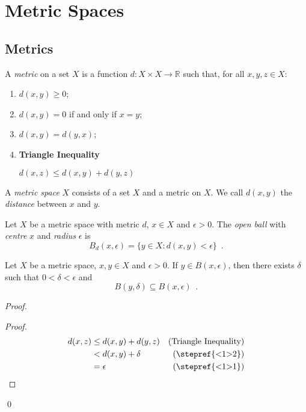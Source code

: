 \chapter{Metric Spaces}

\section{Metrics}

\begin{df}[Metric]
  A \emph{metric} on a set $X$ is a function $d : X \times X \rightarrow
  \mathbb{R}$ such that, for all $x, y, z \in X$:
  \begin{enumerate}
    \item $d(x, y) \geq 0$;
    \item $d(x, y) = 0$ if and only if $x = y$;
    \item $d(x, y) = d(y, x)$;
    \item \textbf{Triangle Inequality}

    $d(x, z) \leq d(x, y) + d(y, z)$
  \end{enumerate}
  A \emph{metric space} $X$ consists of a set $X$ and a metric on $X$. We
  call $d(x, y)$ the \emph{distance} between $x$ and $y$.
\end{df}

\begin{df}
  Let $X$ be a metric space with metric $d$, $x \in X$ and $\epsilon > 0$.
  The \emph{open       ball} with \emph{centre} $x$ and \emph{radius}
  $\epsilon$
  is
  \[ B_d(x, \epsilon) = \{ y \in X : d(x, y) < \epsilon \} \enspace . \]
\end{df}

\begin{lm}
  \label{lm:topology:metric:balls}
  Let $X$ be a metric space, $x, y \in X$ and $\epsilon > 0$. If $y \in B(x,
  \epsilon)$, then there exists $\delta$ such that $0 < \delta < \epsilon$ and
  \[ B(y, \delta) \subseteq B(x, \epsilon) \enspace . \]
\end{lm}

\begin{proof}
  \pf
  \begin{proof}
    \pf
    \begin{align*}
      d(x, z) & \leq d(x, y) + d(y, z) & (\text{Triangle Inequality}) \\
      & < d(x, y) + \delta & (\text{\stepref{<1>2}}) \\
      & = \epsilon & (\text{\stepref{<1>1}})
    \end{align*}
  \end{proof}
  \qed
\end{proof}


